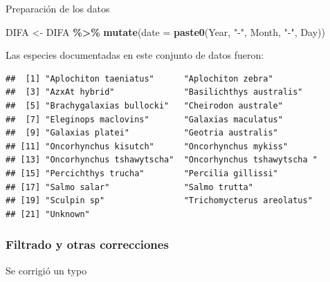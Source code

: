 \documentclass[sn-apa,pdflatex]{sn-jnl}
\newenvironment{Shaded}{\begin{snugshade}}{\end{snugshade}}
\newcommand{\AttributeTok}[1]{\textcolor[rgb]{0.13,0.29,0.53}{#1}}
\newcommand{\FunctionTok}[1]{\textcolor[rgb]{0.13,0.29,0.53}{\textbf{#1}}}
\newcommand{\NormalTok}[1]{#1}
\newcommand{\OtherTok}[1]{\textcolor[rgb]{0.56,0.35,0.01}{#1}}
\newcommand{\SpecialCharTok}[1]{\textcolor[rgb]{0.81,0.36,0.00}{\textbf{#1}}}
\newcommand{\StringTok}[1]{\textcolor[rgb]{0.31,0.60,0.02}{#1}}
\begin{document}
Preparación de los datos

\begin{Shaded}
\begin{Highlighting}[]
\NormalTok{DIFA }\OtherTok{\textless{}{-}}\NormalTok{ DIFA }\SpecialCharTok{\%\textgreater{}\%}
    \FunctionTok{mutate}\NormalTok{(}\AttributeTok{date =} \FunctionTok{paste0}\NormalTok{(Year, }\StringTok{"{-}"}\NormalTok{, Month, }\StringTok{"{-}"}\NormalTok{, Day))}
\end{Highlighting}
\end{Shaded}

Las especies documentadas en este conjunto de datos fueron:

\begin{Shaded}
\end{Shaded}

\begin{verbatim}
##  [1] "Aplochiton taeniatus"      "Aplochiton zebra"         
##  [3] "AzxAt hybrid"              "Basilichthys australis"   
##  [5] "Brachygalaxias bullocki"   "Cheirodon australe"       
##  [7] "Eleginops maclovins"       "Galaxias maculatus"       
##  [9] "Galaxias platei"           "Geotria australis"        
## [11] "Oncorhynchus kisutch"      "Oncorhynchus mykiss"      
## [13] "Oncorhynchus tshawytscha"  "Oncorhynchus tshawytscha "
## [15] "Percichthys trucha"        "Percilia gillissi"        
## [17] "Salmo salar"               "Salmo trutta"             
## [19] "Sculpin sp"                "Trichomycterus areolatus" 
## [21] "Unknown"
\end{verbatim}

\subsubsection{Filtrado y otras
correcciones}\label{filtrado-y-otras-correcciones}

Se corrigió un typo

\begin{Shaded}
\end{Shaded}
\end{document}

